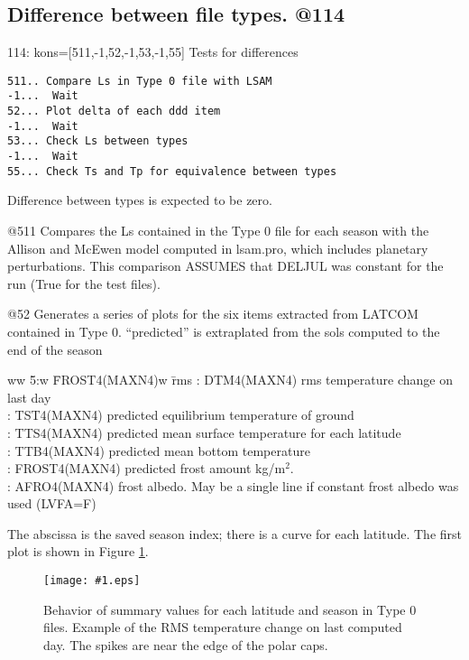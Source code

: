 \documentclass{article}  %
\newcommand{\igc}[1]{\texttt{[image: \#1.eps]}}
\begin{document}
\subsection{Difference between file types.  @114 \label{a114} } %

114: kons=[511,-1,52,-1,53,-1,55] Tests for differences 
\vspace{-3.mm} 
\begin{verbatim}
511.. Compare Ls in Type 0 file with LSAM 
-1...  Wait
52... Plot delta of each ddd item
-1...  Wait
53... Check Ls between types
-1...  Wait
55... Check Ts and Tp for equivalence between types
\end{verbatim}

Difference between types is expected to be zero.

@511 Compares the Ls contained in the Type 0 file for each season with the
Allison and McEwen model computed in lsam.pro, which includes planetary
perturbations. This comparison ASSUMES that DELJUL was constant for the run
(True for the test files).

@52 Generates a series of plots for the six items extracted from LATCOM
contained in Type 0. ``predicted'' is extraplated from the sols computed to the
end of the season
\vspace{-3.mm} \begin{tabbing}
ww \= 5:w \= FROST4(MAXN4)w \= rms \kill
 : \> DTM4(MAXN4)   \> rms temperature change on last day \\
 : \> TST4(MAXN4)   \> predicted equilibrium temperature of ground \\
 : \> TTS4(MAXN4)   \> predicted mean surface temperature for each latitude \\
 : \> TTB4(MAXN4)   \> predicted mean bottom temperature \\
 : \> FROST4(MAXN4) \> predicted frost amount kg/m$^2$. \\
 : \>  AFRO4(MAXN4)  \> frost albedo. May be a single line if constant frost albedo was used (LVFA=F) \\
\end{tabbing}  \vspace{-3.mm}
The abscissa is the saved season index; there is a curve for each latitude. The first plot is shown in Figure \ref{p52a}.
 
\begin{figure}[!ht] \igc{p52a}
\caption[Type 0 summary] {Behavior of summary values for each latitude and season in Type 0 files. Example of 
the RMS temperature change on last computed day. The spikes are near the edge of the polar caps. \label{p52a} } \end{figure}
\end{document}

